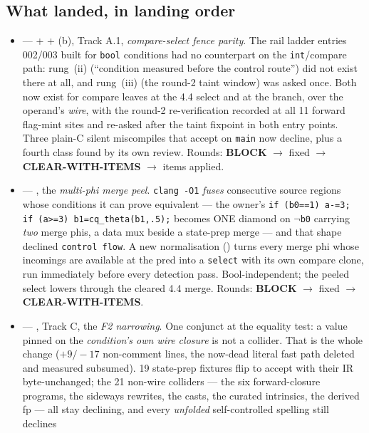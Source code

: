 \subsection*{What landed, in landing order}
\begin{itemize}
  \item {} ---  +  + (b), Track A.1, \emph{compare-select fence
    parity}. The rail ladder entries 002/003 built for \texttt{bool} conditions had no counterpart on the
    \texttt{int}/compare path: rung~(ii) (``condition measured before the control route'') did not exist
    there at all, and rung~(iii) (the round-2 taint window) was asked once. Both now exist for compare
    leaves at the 4.4 select and at the branch, over the operand's \emph{wire}, with the round-2
    re-verification recorded at all 11 forward flag-mint sites and re-asked after the taint fixpoint in
    both entry points. Three plain-C silent miscompiles that accept on \texttt{main} now decline, plus a
    fourth class found by its own review. Rounds: \textbf{BLOCK} \(\to\) fixed \(\to\)
    \textbf{CLEAR-WITH-ITEMS} \(\to\) items applied.
  \item {} --- , the \emph{multi-phi merge peel}. \texttt{clang -O1} \emph{fuses}
    consecutive source regions whose conditions it can prove equivalent --- the owner's
    \texttt{if (b0==1) a-=3; if (a>=3) b1=cq\_theta(b1,.5);} becomes ONE diamond on \(\lnot\)\texttt{b0}
    carrying \emph{two} merge phis, a data mux beside a state-prep merge --- and that shape declined
    \texttt{control flow}. A new normalisation () turns every merge
    phi whose incomings are available at the pred into a \texttt{select} with its own compare clone, run
    immediately before every detection pass. Bool-independent; the peeled select lowers through the
    cleared 4.4 merge. Rounds: \textbf{BLOCK} \(\to\) fixed \(\to\) \textbf{CLEAR-WITH-ITEMS}.
  \item {} --- , Track C, the \emph{F2 narrowing}. One conjunct at the equality
    test: a value pinned on the \emph{condition's own wire closure} is not a collider. That is the whole
    change (\(+9/-17\) non-comment lines, the now-dead literal fast path deleted and measured subsumed).
    19 state-prep fixtures flip to accept with their IR byte-unchanged; the 21 non-wire colliders --- the
    six forward-closure programs, the sideways rewrites, the casts, the curated intrinsics, the derived
    fp --- all stay declining, and every \emph{unfolded} self-controlled spelling still declines

\end{itemize}
